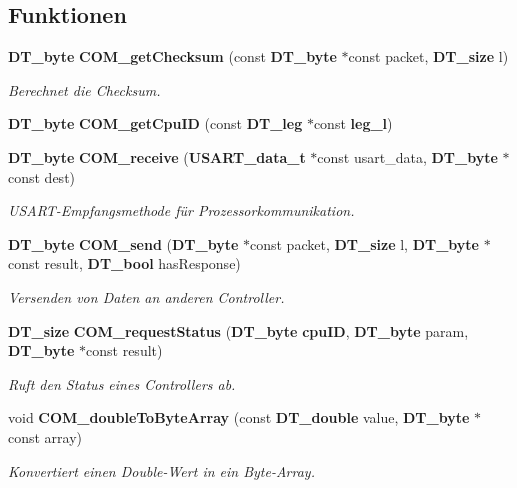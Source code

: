 \subsection*{Funktionen}
\begin{DoxyCompactItemize}
\item 
{\bf DT\_\-byte} {\bf COM\_\-getChecksum} (const {\bf DT\_\-byte} $\ast$const packet, {\bf DT\_\-size} l)
\begin{DoxyCompactList}\small\item\em Berechnet die Checksum. \item\end{DoxyCompactList}\item 
{\bf DT\_\-byte} {\bf COM\_\-getCpuID} (const {\bf DT\_\-leg} $\ast$const {\bf leg\_\-l})
\item 
{\bf DT\_\-byte} {\bf COM\_\-receive} ({\bf USART\_\-data\_\-t} $\ast$const usart\_\-data, {\bf DT\_\-byte} $\ast$const dest)
\begin{DoxyCompactList}\small\item\em USART-\/Empfangsmethode für Prozessorkommunikation. \item\end{DoxyCompactList}\item 
{\bf DT\_\-byte} {\bf COM\_\-send} ({\bf DT\_\-byte} $\ast$const packet, {\bf DT\_\-size} l, {\bf DT\_\-byte} $\ast$const result, {\bf DT\_\-bool} hasResponse)
\begin{DoxyCompactList}\small\item\em Versenden von Daten an anderen Controller. \item\end{DoxyCompactList}\item 
{\bf DT\_\-size} {\bf COM\_\-requestStatus} ({\bf DT\_\-byte} {\bf cpuID}, {\bf DT\_\-byte} param, {\bf DT\_\-byte} $\ast$const result)
\begin{DoxyCompactList}\small\item\em Ruft den Status eines Controllers ab. \item\end{DoxyCompactList}\item 
void {\bf COM\_\-doubleToByteArray} (const {\bf DT\_\-double} value, {\bf DT\_\-byte} $\ast$const array)
\begin{DoxyCompactList}\small\item\em Konvertiert einen Double-\/Wert in ein Byte-\/Array. \item\end{DoxyCompactList}\item 

\end{DoxyCompactItemize}
